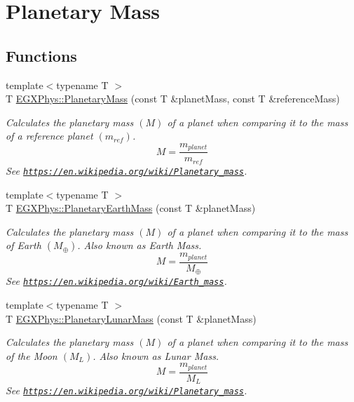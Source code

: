 \hypertarget{group___planetary_mass}{}\section{Planetary Mass}
\label{group___planetary_mass}
\subsection*{Functions}
\begin{DoxyCompactItemize}
\item 
{\footnotesize template$<$typename T $>$ }\\T \mbox{\hyperlink{group___planetary_mass_ga225bcf56fb37468f6d4d46493d403503}{E\+G\+X\+Phys\+::\+Planetary\+Mass}} (const T \&planet\+Mass, const T \&reference\+Mass)
\begin{DoxyCompactList}\small\item\em Calculates the planetary mass $(M)$ of a planet when comparing it to the mass of a reference planet $(m_{ref})$. \[M=\frac{m_{planet}}{m_{ref}}\] See \href{https://en.wikipedia.org/wiki/Planetary_mass}{\tt https\+://en.\+wikipedia.\+org/wiki/\+Planetary\+\_\+mass}. \end{DoxyCompactList}\item 
{\footnotesize template$<$typename T $>$ }\\T \mbox{\hyperlink{group___planetary_mass_ga3d918c2d37a72b42b49aa6c3da08f450}{E\+G\+X\+Phys\+::\+Planetary\+Earth\+Mass}} (const T \&planet\+Mass)
\begin{DoxyCompactList}\small\item\em Calculates the planetary mass $(M)$ of a planet when comparing it to the mass of Earth $(M_\oplus)$. Also known as Earth Mass. \[M=\frac{m_{planet}}{M_\oplus}\] See \href{https://en.wikipedia.org/wiki/Earth_mass}{\tt https\+://en.\+wikipedia.\+org/wiki/\+Earth\+\_\+mass}. \end{DoxyCompactList}\item 
{\footnotesize template$<$typename T $>$ }\\T \mbox{\hyperlink{group___planetary_mass_gaaea9675ef409d141d269d970f2f5e9dd}{E\+G\+X\+Phys\+::\+Planetary\+Lunar\+Mass}} (const T \&planet\+Mass)
\begin{DoxyCompactList}\small\item\em Calculates the planetary mass $(M)$ of a planet when comparing it to the mass of the Moon $(M_L)$. Also known as Lunar Mass. \[M=\frac{m_{planet}}{M_L}\] See \href{https://en.wikipedia.org/wiki/Planetary_mass}{\tt https\+://en.\+wikipedia.\+org/wiki/\+Planetary\+\_\+mass}. \end{DoxyCompactList}\item 

\end{DoxyCompactItemize}

